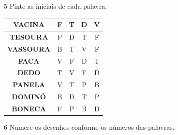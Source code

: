 \num{5} Pinte as iniciais de cada palavra.


\begin{tabular}{|c|c|c|c|c|}
\hline
\textbf{VACINA} & F & T & D & V \\ \hline
\textbf{TESOURA} & P & D & T & F \\ \hline
\textbf{VASSOURA} & B & T & V & F \\ \hline
\textbf{FACA} & V & F & D & T \\ \hline
\textbf{DEDO} & T & V & F & D \\ \hline
\textbf{PANELA} & V & T & P & B \\ \hline
\textbf{DOMINÓ} & B & D & T & P \\ \hline
\textbf{BONECA} & F & P & B & D \\ \hline
\end{tabular}

\num{6} Numere os desenhos conforme os números das palavras.



